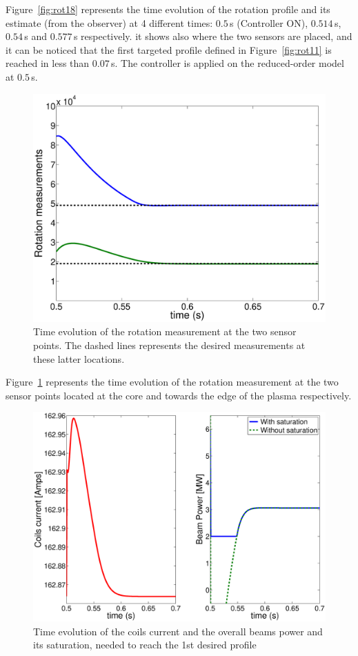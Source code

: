 \documentclass[12pt]{iopart}
\begin{document}
Figure~\ref{fig:rot18} represents the time evolution of the rotation profile and its estimate (from the observer) at 4 different times: $0.5$\,s (Controller ON), $0.514$\,s, $0.54$\,s and $0.577$\,s respectively. it shows also where the two sensors are placed, and it can be noticed that the first targeted profile defined in Figure~\ref{fig:rot11} is reached in less than $0.07$\,s. The controller is applied on the reduced-order model at $0.5$\,s.
\begin{figure}
\centering
\includegraphics[width=\linewidth]{imene_figs/Goum20} 
\caption{Time evolution of the rotation measurement at the two sensor points. The dashed lines represents the desired measurements at these latter locations. }
\label{fig:rot20}
\end{figure}    

Figure~\ref{fig:rot20} represents the time evolution of the rotation measurement at the two sensor points located at the core and towards the edge of the plasma respectively.  



\begin{figure}
\centering
\includegraphics[width=\linewidth]{imene_figs/Goum19l} 
\caption{Time evolution of the coils current and the overall beams power and its saturation, needed to reach the 1st desired profile }
\label{fig:rot19}
\end{figure} 
\end{document}
